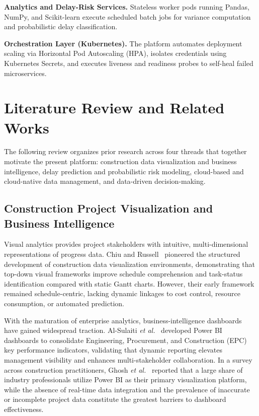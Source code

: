\documentclass[conference]{IEEEtran}
\begin{document}
\textbf{Analytics and Delay-Risk Services.} Stateless worker pods running Pandas, NumPy, and Scikit-learn execute scheduled batch jobs for variance computation and probabilistic delay classification.

\textbf{Orchestration Layer (Kubernetes).} The platform automates deployment scaling via Horizontal Pod Autoscaling (HPA), isolates credentials using Kubernetes Secrets, and executes liveness and readiness probes to self-heal failed microservices.

\section{Literature Review and Related Works}

The following review organizes prior research across four threads that together motivate the present platform: construction data visualization and business intelligence, delay prediction and probabilistic risk modeling, cloud-based and cloud-native data management, and data-driven decision-making.

\subsection{Construction Project Visualization and Business Intelligence}

Visual analytics provides project stakeholders with intuitive, multi-dimensional representations of progress data. Chiu and Russell~\cite{chiu2011design} pioneered the structured development of construction data visualization environments, demonstrating that top-down visual frameworks improve schedule comprehension and task-status identification compared with static Gantt charts. However, their early framework remained schedule-centric, lacking dynamic linkages to cost control, resource consumption, or automated prediction.

With the maturation of enterprise analytics, business-intelligence dashboards have gained widespread traction. Al-Sulaiti \emph{et al.}~\cite{alsulaiti2021using} developed Power BI dashboards to consolidate Engineering, Procurement, and Construction (EPC) key performance indicators, validating that dynamic reporting elevates management visibility and enhances multi-stakeholder collaboration. In a survey across construction practitioners, Ghosh \emph{et al.}~\cite{ghosh2024use} reported that a large share of industry professionals utilize Power BI as their primary visualization platform, while the absence of real-time data integration and the prevalence of inaccurate or incomplete project data constitute the greatest barriers to dashboard effectiveness.
\end{document}
